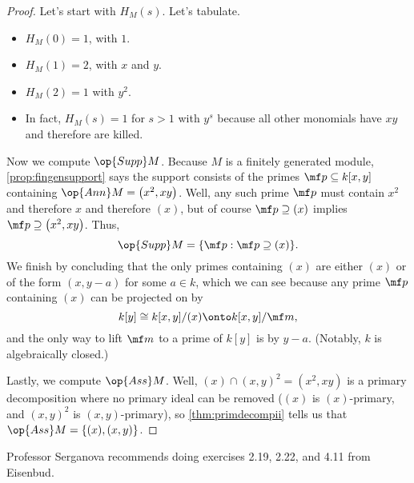 \begin{proof}
	Let's start with $H_M(s)$. Let's tabulate.
	\begin{itemize}
		\item $H_M(0)=1$, with $1$.
		\item $H_M(1)=2$, with $x$ and $y$.
		\item $H_M(2)=1$ with $y^2$.
		\item In fact, $H_M(s)=1$ for $s>1$ with $y^s$ because all other monomials have $xy$ and therefore are killed.
	\end{itemize}

	Now we compute $\op{Supp}M$. Because $M$ is a finitely generated module, \autoref{prop:fingensupport} says the support consists of the primes $\mf p\subseteq k[x,y]$ containing $\op{Ann}M=\left(x^2,xy\right)$. Well, any such prime $\mf p$ must contain $x^2$ and therefore $x$ and therefore $(x)$, but of course $\mf p\supseteq(x)$ implies $\mf p\supseteq\left(x^2,xy\right)$. Thus,
	\[\op{Supp}M=\{\mf p:\mf p\supseteq(x)\}.\]
	We finish by concluding that the only primes containing $(x)$ are either $(x)$ or of the form $(x,y-a)$ for some $a\in k$, which we can see because any prime $\mf p$ containing $(x)$ can be projected on by
	\[k[y]\cong k[x,y]/(x)\onto k[x,y]/\mf m,\]
	and the only way to lift $\mf m$ to a prime of $k[y]$ is by $y-a$. (Notably, $k$ is algebraically closed.)

	Lastly, we compute $\op{Ass}M$. Well, $(x)\cap(x,y)^2=\left(x^2,xy\right)$ is a primary decomposition where no primary ideal can be removed ($(x)$ is $(x)$-primary, and $(x,y)^2$ is $(x,y)$-primary), so \autoref{thm:primdecompii} tells us that $\op{Ass}M=\{(x),(x,y)\}$.
\end{proof}
\begin{remark}
	Professor Serganova recommends doing exercises 2.19, 2.22, and 4.11 from Eisenbud.
\end{remark}